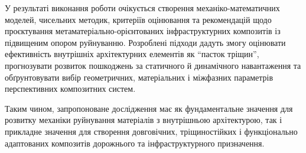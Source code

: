 \documentclass[12pt,a4paper]{article}
\begin{document}
У результаті виконання роботи очікується створення механіко-математичних моделей, чисельних методик, критеріїв оцінювання та рекомендацій щодо проєктування метаматеріально-орієнтованих інфраструктурних композитів із підвищеним опором руйнуванню. Розроблені підходи дадуть змогу оцінювати ефективність внутрішніх архітектурних елементів як ``пасток тріщин'', прогнозувати розвиток пошкоджень за статичного й динамічного навантаження та обґрунтовувати вибір геометричних, матеріальних і міжфазних параметрів перспективних композитних систем.

Таким чином, запропоноване дослідження має як фундаментальне значення для розвитку механіки руйнування матеріалів з внутрішньою архітектурою, так і прикладне значення для створення довговічних, тріщиностійких і функціонально адаптованих композитів дорожнього та інфраструктурного призначення.


\end{document}
